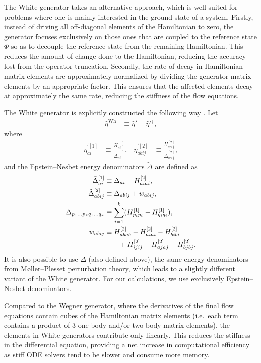 The White generator takes an alternative approach, which is well suited for problems where one is mainly interested in the ground state of a system.  Firstly, instead of driving all off-diagonal elements of the Hamiltonian to zero, the generator focuses exclusively on those ones that are coupled to the reference state $\Phi$ so as to decouple the reference state from the remaining Hamiltonian.  This reduces the amount of change done to the Hamiltonian, reducing the accuracy lost from the operator truncation.  Secondly, the rate of decay in Hamiltonian matrix elements are approximately normalized by dividing the generator matrix elements by an appropriate factor.  This ensures that the affected elements decay at approximately the same rate, reducing the stiffness of the flow equations.

The White generator is explicitly constructed the following way \cite{PhysRevLett.106.222502,White:cond-mat0201346}.  Let
\begin{align*}
\hat{\eta}^{\text{Wh}} &\equiv \hat{\eta}' - \hat{\eta}'{}^\dagger,
\end{align*}
where
\begin{align*}
\eta^{\prime [1]}_{a i} &\equiv \frac{H^{[1]}_{a i}}{\tilde{\Delta}^{[1]}_{a i}}, &
\eta^{\prime [2]}_{a b i j} &\equiv \frac{H^{[2]}_{a b i j}}{\tilde{\Delta}^{[2]}_{a b i j}},
\end{align*}
and the Epstein--Nesbet energy denominators $\tilde{\Delta}$ \cite{shavitt2009many} are defined as
\begin{align}
\tilde{\Delta}^{[1]}_{a i} &\equiv \Delta_{a i} - H^{[2]}_{a i a i}, \notag \\
\tilde{\Delta}^{[2]}_{a b i j} &\equiv \Delta_{a b i j} + w_{a b i j}, \notag \\
\Delta_{p_1 \ldots p_k q_1 \ldots q_k} &\equiv \sum_{i = 1}^k (H^{[1]}_{p_i p_i} -  H^{[1]}_{q_i q_i}), \label{eq:moellerplessetdenominator} \\
w_{a b i j}
  &\equiv H^{[2]}_{a b a b} - H^{[2]}_{a i a i} - H^{[2]}_{b i b i} \notag \\
  &\qquad + H^{[2]}_{i j i j} - H^{[2]}_{a j a j} - H^{[2]}_{b j b j}. \notag
\end{align}
It is also possible \cite{IMSRG} to use $\Delta$ (also defined above), the same energy denominators from M\o ller--Plesset perturbation theory, which leads to a slightly different variant of the White generator.  For our calculations, we use exclusively Epstein--Nesbet denominators.

Compared to the Wegner generator, where the derivatives of the final flow equations contain cubes of the Hamiltonian matrix elements (i.e.\ each term contains a product of 3 one-body and/or two-body matrix elements), the elements in White generators contribute only linearly.  This reduces the stiffness in the differential equation, providing a net increase in computational efficiency as stiff ODE solvers tend to be slower and consume more memory.

